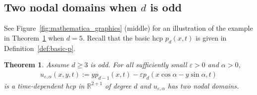 \documentclass[10pt]{amsart}
\newtheorem{theo}{Theorem}[section]
\theoremstyle{definition}\newtheorem{defi}[theo]{Definition}\newtheorem{rema}[theo]{Remark}\newtheorem{exam}[theo]{Example}\newtheorem{exem}[theo]{Example}\newtheorem{nota}[theo]{Notation}
\newcommand{\R}{\mathbb{R}}
\renewcommand{\epsilon}{\varepsilon}
\begin{document}
\subsection{Two nodal domains when \texorpdfstring{$d$}{d} is odd} \label{subsec:1mod4}
See Figure~\ref{fig:mathematica_graphics} (middle) for an illustration of the example in Theorem~\ref{thm:d_odd} when $d=5$. {Recall that the basic hcp $p_d(x,t)$ is given in Definition~\ref{def:basic-p}}.

\begin{theo}\label{thm:d_odd}
Assume $d\geq 3$ is odd. For all sufficiently small $\epsilon>0$ and $\alpha>0$,
\begin{align}\label{eqn:d_odd_u}
u_{\epsilon,\alpha}(x,y,t) := y p_{d-1}(x,t) - \epsilon p_d(x\cos\alpha-y\sin\alpha,t)
\end{align}
is a time-dependent hcp in $\R^{2+1}$ of degree $d$ and $u_{\epsilon,\alpha}$ has two nodal domains.
\end{theo}
\end{document}
